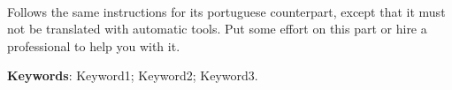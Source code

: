 \ \ \\[2cm]
Follows the same instructions for its portuguese counterpart, except that it must not be translated with automatic tools. Put some effort on this part or hire a professional to help you with it.

\noindent \textbf{Keywords}: Keyword1; Keyword2; Keyword3.
